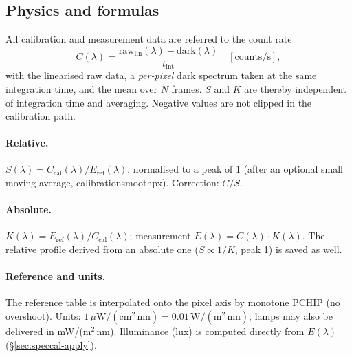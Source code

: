 \documentclass[12pt,a4paper]{article}
\DeclareRobustCommand{\key}[1]{{\ttfamily\small\color{acc2}\def\_{\rawus\allowbreak}#1}}
\begin{document}
\subsection{Physics and formulas}
All calibration and measurement data are referred to the count rate
\[
  C(\lambda) = \frac{\mathrm{raw}_{\mathrm{lin}}(\lambda) - \mathrm{dark}(\lambda)}{t_{\mathrm{int}}}
  \quad[\mathrm{counts/s}] ,
\]
with the linearised raw data, a \emph{per-pixel} dark spectrum taken at the same
integration time, and the mean over $N$ frames. $S$ and $K$ are thereby
independent of integration time and averaging. Negative values are not clipped
in the calibration path.

\paragraph{Relative.}
$S(\lambda) = C_{\mathrm{cal}}(\lambda)/E_{\mathrm{ref}}(\lambda)$, normalised to
a peak of 1 (after an optional small moving average, \key{calibration\_smooth\_px}).
Correction: $C/S$.

\paragraph{Absolute.}
$K(\lambda) = E_{\mathrm{ref}}(\lambda)/C_{\mathrm{cal}}(\lambda)$; measurement
$E(\lambda) = C(\lambda)\cdot K(\lambda)$. The relative profile derived from an
absolute one ($S\propto 1/K$, peak 1) is saved as well.

\paragraph{Reference and units.}
The reference table is interpolated onto the pixel axis by monotone PCHIP
(no overshoot). Units: $1\,\mu\mathrm{W}/(\mathrm{cm}^2\,\mathrm{nm}) =
0.01\,\mathrm{W}/(\mathrm{m}^2\,\mathrm{nm})$; lamps may also be delivered in
mW/(m$^2$\,nm). Illuminance (lux) is computed directly from $E(\lambda)$
(\S\ref{sec:speccal-apply}).
\end{document}
